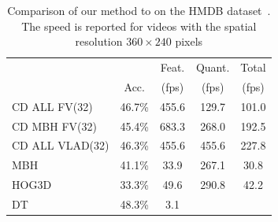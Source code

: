\documentclass[10pt,twocolumn,letterpaper]{article}
\begin{document}
\begin{table}
\begin{center}
\begin{tabular}{|l|c|c|c|c|}
\hline
		 				&  	 		& Feat.                    & Quant. 	& Total	\\
		 				& Acc.		& (fps)                    & (fps) 	& (fps)	\\\hline
CD ALL FV(32)		& 46.7\% 	& 455.6                    & 129.7 	& 101.0	\\ %
CD MBH FV(32)		& 45.4\% 	& 683.3                    & 268.0 	& 192.5	\\ %
CD ALL VLAD(32) & 46.3\%	& 455.6								& 455.6		& 227.8	\\ %
\hline
MBH \cite{Feng13}		& 41.1\% 	& 33.9            	     	& 267.1 & 30.8	\\ %
HOG3D \cite{Feng13}	& 33.3\% 	& 49.6            	   	& 290.8 & 42.2	\\ %
DT	\cite{Wang12}			& 48.3\%& 3.1								&			& \\ %
\hline
\end{tabular}
\smallskip
\caption{Comparison of our method to \cite{Feng13} on the HMDB dataset~\cite{Kuehne11}. The speed is reported for videos with the spatial resolution $360\times 240$ pixels}
\label{tab:hmdb_comparison}
\mbox{}\vspace{-1cm}\\
\end{center}
\end{table}


\end{document}
